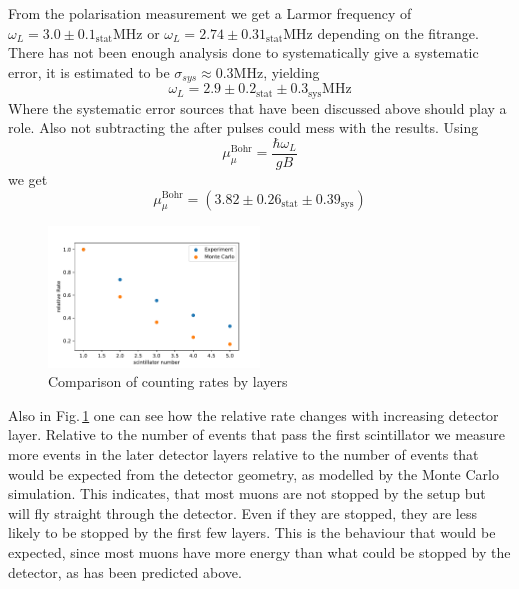 From the polarisation measurement we get a Larmor frequency of $\omega_L =3.0\pm0.1_{\text{stat}}$MHz or $\omega_L = 2.74\pm0.31_{\text{stat}}$MHz depending on the fitrange. There has not been enough analysis done to systematically give a systematic error, it is estimated to be $\sigma_{sys}\approx0.3$MHz, yielding
\begin{equation}
	\omega_L =2.9\pm0.2_{\text{stat}}\pm0.3_{\text{sys}}\text{MHz}
\end{equation}
Where the systematic error sources that have been discussed above should play a role. Also not subtracting the after pulses could mess with the results. 
Using
\begin{equation}
	\mu_{\mu}^{\text{Bohr}} = \frac{\hbar\omega_L}{gB} 
\end{equation}
we get
\begin{equation}
	\mu_{\mu}^{\text{Bohr}} = (3.82\pm0.26_{\text{stat}}\pm0.39_{\text{sys}})
\end{equation}

\begin{figure}[H]
    \centering
    \includegraphics[width=0.5\textwidth]{figures/relativeRate_exp.pdf}
    \caption{Comparison of counting rates by layers}
    \label{f:compmc}
\end{figure}


Also in Fig.\,\ref{f:compmc} one can see how the relative rate changes with increasing detector layer. Relative to the number of events that pass the first scintillator we measure more events in the later detector layers relative to the number of events that would be expected from the detector geometry, as modelled by the Monte Carlo simulation. This indicates, that most muons are not stopped by the setup but will fly straight through the detector. Even if they are stopped, they are less likely to be stopped by the first few layers. This is the behaviour that would be expected, since most muons have more energy than what could be stopped by the detector, as has been predicted above. 